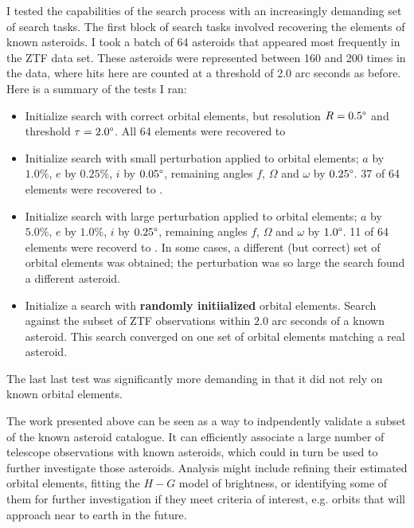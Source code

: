 I tested the capabilities of the search process with an increasingly demanding set of search tasks.
The first block of search tasks involved recovering the elements of known asteroids.
I took a batch of 64 asteroids that appeared most frequently in the ZTF data set.
These asteroids were represented between 160 and 200 times in the data, 
where hits here are counted at a threshold of 2.0 arc seconds as before.
Here is a summary of the tests I ran:
\begin{itemize}
\item Initialize search with correct orbital elements, but resolution $R = 0.5 \degree$ and threshold $\tau = 2.0 \degree$.
All 64 elements were recovered to 
\item Initialize search with small perturbation applied to orbital elements; $a$ by $1.0\%$, $e$ by $0.25\%$, $i$ by $0.05 \degree$,
remaining angles $f$, $\Omega$ and $\omega$ by $0.25 \degree$.
37 of 64 elements were recovered to .
\item Initialize search with large perturbation applied to orbital elements; $a$ by $5.0\%$, $e$ by $1.0\%$, $i$ by $0.25 \degree$,
remaining angles $f$, $\Omega$ and $\omega$ by $1.0 \degree$.
11 of 64 elements were recoverd to .
In some cases, a different (but correct) set of orbital elements was obtained;
the perturbation was so large the search found a different asteroid.
\item Initialize a search with \textbf{randomly initiialized} orbital elements.
Search against the subset of ZTF observations within $2.0$ arc seconds of a known asteroid.
This search converged on one set of orbital elements matching a real asteroid.
\end{itemize}
The last last test was significantly more demanding in that it did not rely on known orbital elements.

The work presented above can be seen as a way to indpendently validate a subset of the known asteroid catalogue.
It can efficiently associate a large number of telescope observations with known asteroids,
which could in turn be used to further investigate those asteroids.
Analysis might include refining their estimated orbital elements, 
fitting the $H-G$ model of brightness, or identifying some of them for further investigation if they meet criteria of interest,
e.g. orbits that will approach near to earth in the future.

